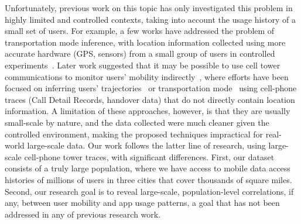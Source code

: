 
Unfortunately, previous work on this topic has only investigated this problem in highly limited and controlled contexts,
taking into account the usage history of a small set of users.
For example, a few works have addressed the problem of transportation mode inference,
with location information collected using more accurate 
hardware (\eg GPS, sensors) %
from a small group of users in controlled experiments~\cite{ohashi2014automatic, ryder2009ambulation, zheng2010understanding, biljecki2013transportation, stenneth2011transportation, waga2012detecting, widhalm2012transport, Reddy:2010:UMP:1689239.1689243}.
Later work suggested that it may be possible to use cell tower communications to monitor users' mobility indirectly~\cite{rose2006mobile},
where efforts have been focused on inferring users' trajectories~\cite{Alsolami2012Auth,jiang2013review}
or transportation mode~\cite{wang2010transportation,bekhor2015investigation} using cell-phone traces
(\eg Call Detail Records, handover data) that do not directly contain location information. 
A limitation of these approaches, however, is that they are usually small-scale by nature, and the 
data collected were much cleaner 
given the controlled environment, making the proposed techniques impractical  for real-world large-scale data. 
Our work follows the latter line of research, using large-scale cell-phone tower traces, with significant differences. 
First, our dataset consists of a truly large population,
where we have access to mobile data access histories of millions of users in three cities that cover thousands of square miles.
Second, %
our research goal is to reveal large-scale, population-level correlations,
if any, between user mobility and app usage patterns,
a goal that has not been addressed in any of previous research work.

